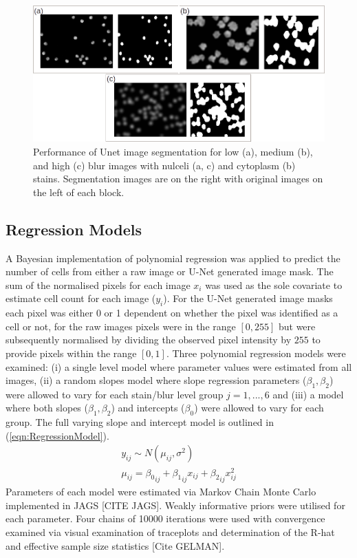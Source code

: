 \documentclass[isoft]{poster_class_UofC}
\begin{document}
\begin{poster}
           \begin{figure}
            \centering
            \captionsetup{type=figure}
            \includegraphics[scale=1.5]{./images/cell_images.png}
            \caption{Performance of Unet image segmentation for low (a), medium (b), and high (c) blur images with nulceli (a, c) and cytoplasm (b) stains.  Segmentation images are on the right with original images on the left of each block.}
            \label{fig:segmentation_performance}
        \end{figure}     
          
        \subsection{Regression Models}      
     A Bayesian implementation of polynomial regression was applied to predict the number of cells from either a raw image or U-Net generated image mask.  The sum of the normalised pixels for each image $x_i$ was used as the sole covariate to estimate cell count for each image ($y_i$).   For the U-Net generated image masks each pixel was either 0 or 1 dependent on whether the pixel was identified as a cell or not, for the raw images pixels were in the range $[0,255]$ but were subsequently normalised by dividing the observed pixel intensity by $255$ to provide pixels within the range $[0,1]$.  
     Three polynomial regression models were examined: (i) a single level model where parameter values were estimated from all images, (ii) a random slopes model where slope regression parameters ($\beta_1, \beta_2$) were allowed to vary for each stain/blur level group $j = 1, ..., 6$ and (iii) a model where both slopes ($\beta_1, \beta_2$) and intercepts ($\beta_0$) were allowed to vary for each group.  The full varying slope and intercept model is outlined in  (\ref{eqn:RegressionModel}).
\begin{align}
y_{ij} \sim N(\mu_{ij}, \sigma^2) \nonumber\\
\mu_{ij} = {\beta_0}_{ij} + {\beta_1}_{ij} x_{ij} + {\beta_2}_{ij} x_{ij}^2 \label{eqn:RegressionModel}
\end{align}     
     Parameters of each model were estimated via Markov Chain Monte Carlo implemented in JAGS [CITE JAGS]. Weakly informative priors were utilised for each parameter. Four chains of 10000 iterations were used with convergence examined via visual examination of traceplots and determination of the R-hat and effective sample size statistics [Cite GELMAN].     
        

\end{poster}
\end{document}
